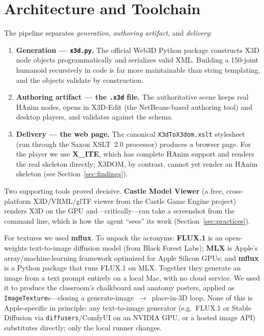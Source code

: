 \documentclass[11pt]{article}
\begin{document}
\section{Architecture and Toolchain}\label{sec:arch}

The pipeline separates \emph{generation}, \emph{authoring artifact}, and
\emph{delivery}:

\begin{enumerate}[leftmargin=1.4em]
\item \textbf{Generation --- \texttt{x3d.py}.} The official Web3D Python package
  constructs X3D node objects programmatically and serializes valid XML. Building
  a 150-joint humanoid recursively in code is far more maintainable than string
  templating, and the objects validate by construction.
\item \textbf{Authoring artifact --- the \texttt{.x3d} file.} The authoritative
  scene keeps real HAnim nodes, opens in X3D-Edit (the NetBeans-based authoring
  tool) and desktop players, and validates against the schema.
\item \textbf{Delivery --- the web page.} The canonical \texttt{X3dToX3dom.xslt}
  stylesheet (run through the Saxon XSLT~2.0 processor) produces a browser page.
  For the player we use \textbf{X\_ITE}, which has complete HAnim support and
  renders the real skeleton directly; X3DOM, by contrast, cannot yet render an
  HAnim skeleton (see Section~\ref{sec:findings}).
\end{enumerate}

Two supporting tools proved decisive. \textbf{Castle Model Viewer} (a free,
cross-platform X3D/VRML/glTF viewer from the Castle Game Engine project) renders
X3D on the GPU and---critically---can take a screenshot from the command line,
which is how the agent ``sees'' its work (Section~\ref{sec:practices}).

For textures we used \textbf{mflux}. To unpack the acronyms: \textbf{FLUX.1} is
an open-weights text-to-image diffusion model (from Black Forest Labs);
\textbf{MLX} is Apple's array/machine-learning framework optimized for Apple
Silicon GPUs; and \textbf{mflux} is a Python package that runs FLUX.1 on MLX.
Together they generate an image from a text prompt entirely on a local Mac, with
no cloud service. We used it to produce the classroom's chalkboard and anatomy
posters, applied as \texttt{ImageTexture}s---closing a
generate-image~$\rightarrow$~place-in-3D loop. None of this is Apple-specific in
principle: any text-to-image generator (e.g.\ FLUX.1 or Stable Diffusion via
\texttt{diffusers}/ComfyUI on an NVIDIA GPU, or a hosted image API) substitutes
directly; only the local runner changes.
\end{document}
